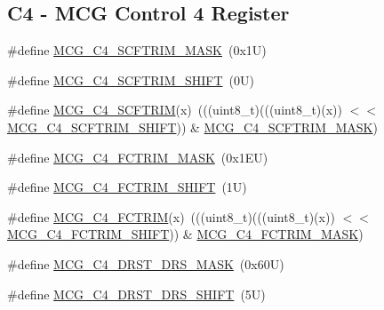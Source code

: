 \subsection*{C4 -\/ M\+CG Control 4 Register}
\begin{DoxyCompactItemize}
\item 
\#define \mbox{\hyperlink{group___m_c_g___register___masks_ga7386e83fdee774ec5d6ec402bae1e432}{M\+C\+G\+\_\+\+C4\+\_\+\+S\+C\+F\+T\+R\+I\+M\+\_\+\+M\+A\+SK}}~(0x1\+U)
\item 
\#define \mbox{\hyperlink{group___m_c_g___register___masks_ga1114052674119b01137ef4b4885ab757}{M\+C\+G\+\_\+\+C4\+\_\+\+S\+C\+F\+T\+R\+I\+M\+\_\+\+S\+H\+I\+FT}}~(0\+U)
\item 
\#define \mbox{\hyperlink{group___m_c_g___register___masks_ga4dc087a188bd21971ad0867f4af9330c}{M\+C\+G\+\_\+\+C4\+\_\+\+S\+C\+F\+T\+R\+IM}}(x)~(((uint8\+\_\+t)(((uint8\+\_\+t)(x)) $<$$<$ \mbox{\hyperlink{group___m_c_g___register___masks_ga1114052674119b01137ef4b4885ab757}{M\+C\+G\+\_\+\+C4\+\_\+\+S\+C\+F\+T\+R\+I\+M\+\_\+\+S\+H\+I\+FT}})) \& \mbox{\hyperlink{group___m_c_g___register___masks_ga7386e83fdee774ec5d6ec402bae1e432}{M\+C\+G\+\_\+\+C4\+\_\+\+S\+C\+F\+T\+R\+I\+M\+\_\+\+M\+A\+SK}})
\item 
\#define \mbox{\hyperlink{group___m_c_g___register___masks_ga91610035649d14c5027419db0bfa3231}{M\+C\+G\+\_\+\+C4\+\_\+\+F\+C\+T\+R\+I\+M\+\_\+\+M\+A\+SK}}~(0x1\+E\+U)
\item 
\#define \mbox{\hyperlink{group___m_c_g___register___masks_ga0a1b1f2be0b8e9afc3ff91ab11d71a1e}{M\+C\+G\+\_\+\+C4\+\_\+\+F\+C\+T\+R\+I\+M\+\_\+\+S\+H\+I\+FT}}~(1\+U)
\item 
\#define \mbox{\hyperlink{group___m_c_g___register___masks_ga7ffe6f164c3d7440b9911c8de59b7171}{M\+C\+G\+\_\+\+C4\+\_\+\+F\+C\+T\+R\+IM}}(x)~(((uint8\+\_\+t)(((uint8\+\_\+t)(x)) $<$$<$ \mbox{\hyperlink{group___m_c_g___register___masks_ga0a1b1f2be0b8e9afc3ff91ab11d71a1e}{M\+C\+G\+\_\+\+C4\+\_\+\+F\+C\+T\+R\+I\+M\+\_\+\+S\+H\+I\+FT}})) \& \mbox{\hyperlink{group___m_c_g___register___masks_ga91610035649d14c5027419db0bfa3231}{M\+C\+G\+\_\+\+C4\+\_\+\+F\+C\+T\+R\+I\+M\+\_\+\+M\+A\+SK}})
\item 
\#define \mbox{\hyperlink{group___m_c_g___register___masks_ga7f6629e8d17efb2cec3d2f63d09ede5a}{M\+C\+G\+\_\+\+C4\+\_\+\+D\+R\+S\+T\+\_\+\+D\+R\+S\+\_\+\+M\+A\+SK}}~(0x60\+U)
\item 
\#define \mbox{\hyperlink{group___m_c_g___register___masks_ga27d4baa0c8a770f1f67ab47e6407e948}{M\+C\+G\+\_\+\+C4\+\_\+\+D\+R\+S\+T\+\_\+\+D\+R\+S\+\_\+\+S\+H\+I\+FT}}~(5\+U)

\end{DoxyCompactItemize}
